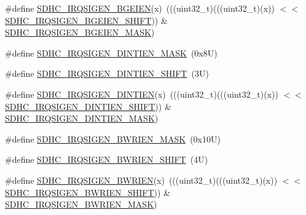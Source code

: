 \begin{DoxyCompactItemize}
\item 
\#define \mbox{\hyperlink{group___s_d_h_c___register___masks_gaf588be34e6d7c52e3e00b582000c12e5}{S\+D\+H\+C\+\_\+\+I\+R\+Q\+S\+I\+G\+E\+N\+\_\+\+B\+G\+E\+I\+EN}}(x)~(((uint32\+\_\+t)(((uint32\+\_\+t)(x)) $<$$<$ \mbox{\hyperlink{group___s_d_h_c___register___masks_ga4a14bf5315dcb669dc529920384cdf97}{S\+D\+H\+C\+\_\+\+I\+R\+Q\+S\+I\+G\+E\+N\+\_\+\+B\+G\+E\+I\+E\+N\+\_\+\+S\+H\+I\+FT}})) \& \mbox{\hyperlink{group___s_d_h_c___register___masks_ga56ccc2a22e90f8d92cf3a7ad63791861}{S\+D\+H\+C\+\_\+\+I\+R\+Q\+S\+I\+G\+E\+N\+\_\+\+B\+G\+E\+I\+E\+N\+\_\+\+M\+A\+SK}})
\item 
\#define \mbox{\hyperlink{group___s_d_h_c___register___masks_ga9414ef10609a933fd60a109700f44498}{S\+D\+H\+C\+\_\+\+I\+R\+Q\+S\+I\+G\+E\+N\+\_\+\+D\+I\+N\+T\+I\+E\+N\+\_\+\+M\+A\+SK}}~(0x8\+U)
\item 
\#define \mbox{\hyperlink{group___s_d_h_c___register___masks_gaafe7e328f182b268af1b86b90f8430c8}{S\+D\+H\+C\+\_\+\+I\+R\+Q\+S\+I\+G\+E\+N\+\_\+\+D\+I\+N\+T\+I\+E\+N\+\_\+\+S\+H\+I\+FT}}~(3\+U)
\item 
\#define \mbox{\hyperlink{group___s_d_h_c___register___masks_ga46cbdf503198cd5bf0bc219bf95951e8}{S\+D\+H\+C\+\_\+\+I\+R\+Q\+S\+I\+G\+E\+N\+\_\+\+D\+I\+N\+T\+I\+EN}}(x)~(((uint32\+\_\+t)(((uint32\+\_\+t)(x)) $<$$<$ \mbox{\hyperlink{group___s_d_h_c___register___masks_gaafe7e328f182b268af1b86b90f8430c8}{S\+D\+H\+C\+\_\+\+I\+R\+Q\+S\+I\+G\+E\+N\+\_\+\+D\+I\+N\+T\+I\+E\+N\+\_\+\+S\+H\+I\+FT}})) \& \mbox{\hyperlink{group___s_d_h_c___register___masks_ga9414ef10609a933fd60a109700f44498}{S\+D\+H\+C\+\_\+\+I\+R\+Q\+S\+I\+G\+E\+N\+\_\+\+D\+I\+N\+T\+I\+E\+N\+\_\+\+M\+A\+SK}})
\item 
\#define \mbox{\hyperlink{group___s_d_h_c___register___masks_ga127a20751da5c0a3b1db2619fd29a5bf}{S\+D\+H\+C\+\_\+\+I\+R\+Q\+S\+I\+G\+E\+N\+\_\+\+B\+W\+R\+I\+E\+N\+\_\+\+M\+A\+SK}}~(0x10\+U)
\item 
\#define \mbox{\hyperlink{group___s_d_h_c___register___masks_ga5a0a6e7cdb390a6254c3c037d4ea241c}{S\+D\+H\+C\+\_\+\+I\+R\+Q\+S\+I\+G\+E\+N\+\_\+\+B\+W\+R\+I\+E\+N\+\_\+\+S\+H\+I\+FT}}~(4\+U)
\item 
\#define \mbox{\hyperlink{group___s_d_h_c___register___masks_gaaa5b659907c523d0ca147a57188f12fb}{S\+D\+H\+C\+\_\+\+I\+R\+Q\+S\+I\+G\+E\+N\+\_\+\+B\+W\+R\+I\+EN}}(x)~(((uint32\+\_\+t)(((uint32\+\_\+t)(x)) $<$$<$ \mbox{\hyperlink{group___s_d_h_c___register___masks_ga5a0a6e7cdb390a6254c3c037d4ea241c}{S\+D\+H\+C\+\_\+\+I\+R\+Q\+S\+I\+G\+E\+N\+\_\+\+B\+W\+R\+I\+E\+N\+\_\+\+S\+H\+I\+FT}})) \& \mbox{\hyperlink{group___s_d_h_c___register___masks_ga127a20751da5c0a3b1db2619fd29a5bf}{S\+D\+H\+C\+\_\+\+I\+R\+Q\+S\+I\+G\+E\+N\+\_\+\+B\+W\+R\+I\+E\+N\+\_\+\+M\+A\+SK}})
$$
\end{DoxyCompactItemize}
